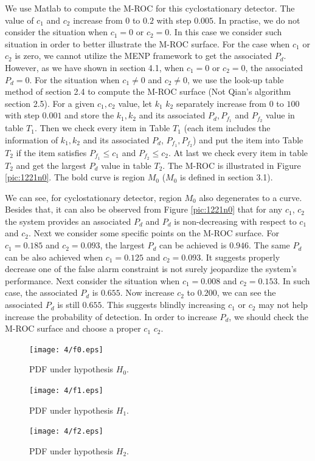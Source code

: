We use Matlab to compute the M-ROC for this cyclostationary detector. The value of $c_1$ and $c_2$ increase from $0$ to $0.2$ with step $0.005$. In practise, we do not consider the situation when $c_1 = 0$ or $c_2 = 0$.  In this case we consider such situation in order to better illustrate the M-ROC surface. For the case when $c_1$ or $c_2$ is zero, we cannot utilize the MENP framework to get the associated $P_d$.  However, as we have shown in section 4.1, when $c_1 = 0$ or $c_2 = 0$, the associated $P_d=0$.   For the situation when $c_1 \neq 0$ and $c_2 \neq 0$, we use the look-up table method of section 2.4 to compute the M-ROC surface (Not Qian's algorithm section 2.5).  For a given $c_1, c_2$ value, let $k_1$ $k_2$ separately increase from $0$ to $100$ with step $0.001$ and store the $k_1, k_2$ and its associated $P_d, P_{f_1}$ and $P_{f_2}$ value in table $T_1$. 
Then we check every item in Table $T_1$ (each item includes the information of $k_1, k_2$ and its associated $P_d$, $P_{f_1}, P_{f_2}$) and put the item into Table $T_2$ if the item satisfies $P_{f_1} \leq c_1$ and $P_{f_2} \leq c_2$. At last we check every item in table $T_2$ and get the largest $P_d$ value in table $T_2$.  
The M-ROC is illustrated in Figure \ref{pic:1221n0}. The bold curve is region $M_0$ ($M_0$ is defined in section 3.1).  

We can see, for cyclostationary detector, region $M_0$ also degenerates to a curve. Besides that, it can also be observed from Figure \ref{pic:1221n0} that for any $c_1$, $c_2$ the system provides an associated $P_d$ and $P_d$ is non-decreasing with respect to $c_1$ and $c_2$.
Next we consider some specific points on the M-ROC surface.  
For $c_1 = 0.185$ and $c_2  = 0.093$, the largest $P_d$ can be achieved is $0.946$. The same $P_d$ can be also achieved when $c_1 = 0.125$ and $c_2 = 0.093$. It suggests properly decrease one of the false alarm constraint is not surely jeopardize the system's performance.  
Next consider the situation when $c_1 = 0.008$ and $c_2 = 0.153$. In such case, the associated $P_d$ is $0.655$. Now increase $c_2$ to $0.200$, we can see the associated $P_d$ is still $0.655$.  This suggests blindly increasing $c_1$ or $c_2$ may not help increase the probability of detection.
In order to increase $P_d$, we should check the M-ROC surface and choose a proper $c_1$ $c_2$.

\begin{figure}[!t]
  \centering 
  \texttt{[image: 4/f0.eps]}
  \caption{PDF under hypothesis $H_0$.}
  \label{pic:1218n0}
\end{figure}
\begin{figure}[!t]
  \centering 
  \texttt{[image: 4/f1.eps]}
  \caption{PDF under hypothesis $H_1$.}
  \label{pic:1218n1}
\end{figure}
\begin{figure}[!t]
  \centering 
  \texttt{[image: 4/f2.eps]}
  \caption{PDF under hypothesis $H_2$.}
  \label{pic:1218n2}
\end{figure}

